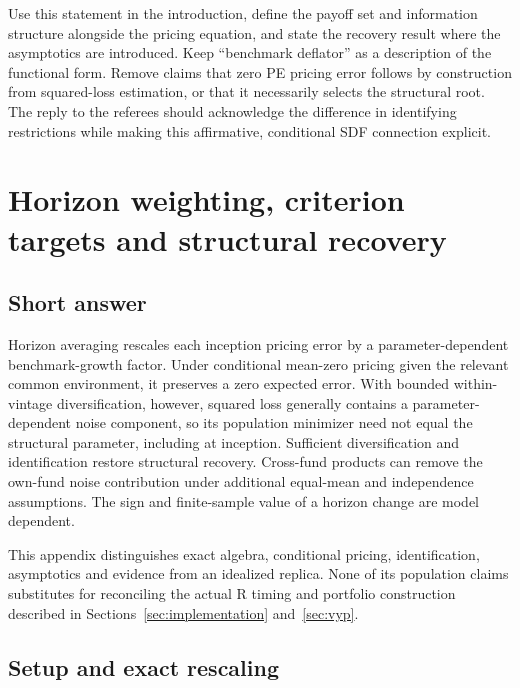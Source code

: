 \documentclass[11pt]{article}
\theoremstyle{plain}
\theoremstyle{definition}
\begin{document}
Use this statement in the introduction, define the payoff set and information structure alongside the pricing equation, and state the recovery result where the asymptotics are introduced. Keep ``benchmark deflator'' as a description of the functional form. Remove claims that zero PE pricing error follows by construction from squared-loss estimation, or that it necessarily selects the structural root. The reply to the referees should acknowledge the difference in identifying restrictions while making this affirmative, conditional SDF connection explicit.

\clearpage
\section{Horizon weighting, criterion targets and structural recovery}
\label{app:horizon}

\subsection{Short answer}

Horizon averaging rescales each inception pricing error by a parameter-dependent benchmark-growth factor. Under conditional mean-zero pricing given the relevant common environment, it preserves a zero expected error. With bounded within-vintage diversification, however, squared loss generally contains a parameter-dependent noise component, so its population minimizer need not equal the structural parameter, including at inception. Sufficient diversification and identification restore structural recovery. Cross-fund products can remove the own-fund noise contribution under additional equal-mean and independence assumptions. The sign and finite-sample value of a horizon change are model dependent.

This appendix distinguishes exact algebra, conditional pricing, identification, asymptotics and evidence from an idealized replica. None of its population claims substitutes for reconciling the actual R timing and portfolio construction described in Sections~\ref{sec:implementation} and~\ref{sec:vyp}.

\subsection{Setup and exact rescaling}
\end{document}
